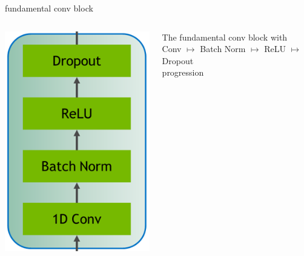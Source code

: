 \documentclass[aspectratio=169,xcolor={dvipsnames,svgnames}]{beamer}
\begin{document}
\begin{frame}[label={sec:org490a631}]{fundamental conv block}
\begin{columns}
\begin{column}{0.2\columnwidth}
\begin{center}
\includegraphics[width=.9\linewidth]{org-download-images/Contribution/2024-09-16_22-58-22_screenshot.png}
\end{center}
\end{column}

\begin{column}{0.8\columnwidth}
The fundamental conv block with \\[0pt]
Conv \(\mapsto\) Batch Norm \(\mapsto\) ReLU \(\mapsto\)
Dropout \\[0pt]
progression
\end{column}
\end{columns}
\end{frame}
\end{document}
